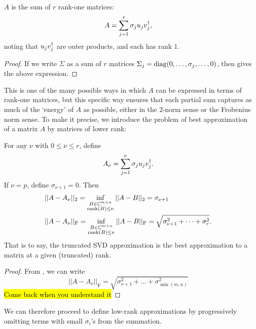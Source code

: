 \documentclass{article}
\begin{document}
\begin{theorem}
    $A$ is the sum of $r$ rank-one matrices:
    \begin{equation}
        A=\sum_{j=1}^r\sigma_j u_jv_j^{\dagger},
    \end{equation}
    noting that $u_jv_j^{\dagger}$ are outer products, and each has rank $1$.
\end{theorem}
\begin{proof}
    If we write $\Sigma$ as a sum of $r$ matrices $\Sigma_j=\operatorname{diag}(0,\dots,\sigma_j,\dots,0)$, then  gives the above expression.
\end{proof}
This is one of the many possible ways in which $A$ can be expressed in terms of rank-one matrices, but this specific way ensures that each partial sum captures as much of the `energy' of $A$ as possible, either in the $2$-norm sense or the Frobenius norm sense. To make it precise, we introduce the problem of best approximation of a matrix $A$ by matrices of lower rank:
\begin{theorem}
    For any $\nu$ with $0\leq\nu\leq r$, define
    \begin{equation}
        A_{\nu}=\sum_{j=1}^{\nu}\sigma_j u_jv_j^{\dagger}.
    \end{equation}
    If $\nu=p$, define $\sigma_{\nu+1}=0$. Then
    \begin{align}
        &||A-A_{\nu}||_2=\inf_{\substack{B\in\mathbb{C}^{m\times n}\\ \operatorname{rank}(B)\leq\nu}}||A-B||_2=\sigma_{\nu+1}\\
        &||A-A_{\nu}||_{\mathrm{F}}=\inf_{\substack{B\in\mathbb{C}^{m\times n}\\ \operatorname{rank}(B)\leq\nu}}||A-B||_{\mathrm{F}}=\sqrt{\sigma_{\nu+1}^2+\dots+\sigma_r^2}.
    \end{align}
    That is to say, the truncated SVD approximation is the best approximation to a matrix at a given (truncated) rank.
\end{theorem}
\begin{proof}
From , we can write
    \begin{equation}
        ||A-A_{\nu}||_{\mathrm{F}}=\sqrt{\sigma_{\nu+1}^2+\dots+\sigma^2_{\min(m,n)}}
    \end{equation}
    \hl{Come back when you understand it}\cite[p. 36]{trefethenNumericalLinearAlgebra2022}
\end{proof}
We can therefore proceed to define low-rank approximations by progressively omitting terms with small $\sigma_i$'s from the summation.
\end{document}

